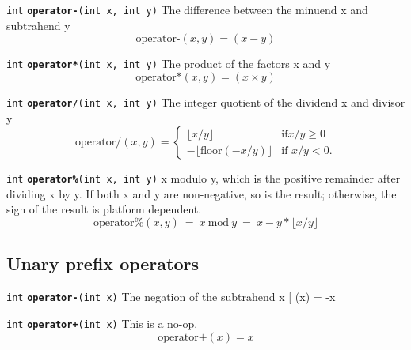 \documentclass[
  10pt,
]{book}
\begin{document}
\texttt{int} \textbf{\texttt{operator-}}\texttt{(int\ x,\ int\ y)}\newline
The difference between the minuend x and subtrahend y \[
\text{operator-}(x,y) = (x - y) \]


\texttt{int} \textbf{\texttt{operator*}}\texttt{(int\ x,\ int\ y)}\newline
The product of the factors x and y \[ \text{operator*}(x,y) = (x
\times y) \]


\texttt{int} \textbf{\texttt{operator/}}\texttt{(int\ x,\ int\ y)}\newline
The integer quotient of the dividend x and divisor y \[
\text{operator/}(x,y) = \begin{cases} \lfloor x / y \rfloor & \text{if
} x / y \geq 0 \\ - \lfloor \text{floor}(-x / y) \rfloor & \text{if }
x / y < 0. \end{cases} \]


\texttt{int} \textbf{\texttt{operator\%}}\texttt{(int\ x,\ int\ y)}\newline
x modulo y, which is the positive remainder after dividing x by y. If
both x and y are non-negative, so is the result; otherwise, the sign
of the result is platform dependent. \[ \mathrm{operator\%}(x, y) \ =
\ x \ \text{mod} \ y \ = \ x - y * \lfloor x / y \rfloor \]

\hypertarget{unary-prefix-operators}{%
\subsection{Unary prefix operators}\label{unary-prefix-operators}}


\texttt{int} \textbf{\texttt{operator-}}\texttt{(int\ x)}\newline
The negation of the subtrahend x {[} (x) = -x


\texttt{int} \textbf{\texttt{operator+}}\texttt{(int\ x)}\newline
This is a no-op. \[ \text{operator+}(x) = x \]
\end{document}
